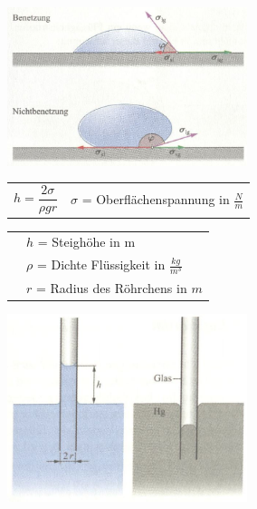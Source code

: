 		\begin{minipage}[t]{10cm}
			\vspace{-\ht\strutbox}\includegraphics[width=7cm]{./bilder/Grenzflaechenspannung.jpg}
		\end{minipage}
		\newline
		\newline
		\newline
		\begin{minipage}[t]{12cm}
				\renewcommand{\arraystretch}{2.5}
				\begin{tabular}{ p{4cm} | p{7cm}}
					$h = \dfrac{2 \sigma}{\rho gr}$	&	$\sigma$ = Oberflächenspannung in $\frac{N}{m}$\\
				\end{tabular}
				\renewcommand{\arraystretch}{1.5}
				\begin{tabular}{ p{4cm} | p{7cm}}
					& $h$ = Steighöhe in m\\
					& $\rho$ = Dichte Flüssigkeit in $\frac{kg}{m^3}$\\
					& $r$ = Radius des Röhrchens in $m$\\
				\end{tabular}
				\renewcommand{\arraystretch}{1}
		\end{minipage}
		\begin{minipage}[t]{10cm}
			\vspace{-\ht\strutbox}\includegraphics[width=7cm]{./bilder/Kapillaritaet.jpg}
		\end{minipage}
	